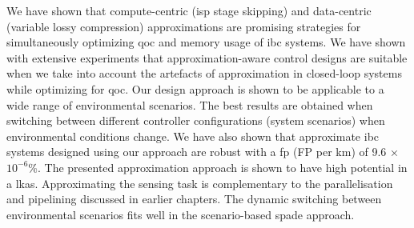 We have shown that compute-centric (\gls{isp} stage skipping) and data-centric (variable lossy compression) approximations are promising strategies for simultaneously optimizing \gls{qoc} and memory usage of \gls{ibc} systems. We have shown with extensive experiments that approximation-aware control designs are suitable when we take into account the artefacts of approximation in closed-loop systems while optimizing for \gls{qoc}. 
Our design approach is shown to be applicable to a wide range of environmental scenarios. The best results are obtained when switching between different controller configurations (system scenarios) when environmental conditions change.
We have also shown that approximate \gls{ibc} systems designed using our approach are robust with a \acrlong{fp} (FP per km) of 9.6 × $10^{-6}$\%. 
The presented approximation approach is shown to have high potential in a \gls{lkas}. Approximating the sensing task is complementary to the parallelisation and pipelining discussed in earlier chapters. The dynamic switching between environmental scenarios fits well in the scenario-based \gls{spade} approach.